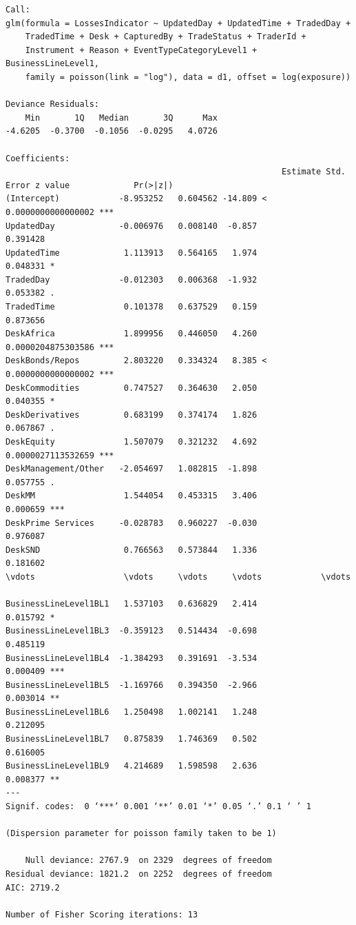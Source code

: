 \documentclass[]{DissertateUSU}
\begin{document}
\begin{verbatim}
Call:
glm(formula = LossesIndicator ~ UpdatedDay + UpdatedTime + TradedDay + 
    TradedTime + Desk + CapturedBy + TradeStatus + TraderId + 
    Instrument + Reason + EventTypeCategoryLevel1 + BusinessLineLevel1, 
    family = poisson(link = "log"), data = d1, offset = log(exposure))

Deviance Residuals: 
    Min       1Q   Median       3Q      Max  
-4.6205  -0.3700  -0.1056  -0.0295   4.0726  

Coefficients:
                                                        Estimate Std. Error z value             Pr(>|z|)    
(Intercept)            -8.953252   0.604562 -14.809 < 0.0000000000000002 ***
UpdatedDay             -0.006976   0.008140  -0.857             0.391428    
UpdatedTime             1.113913   0.564165   1.974             0.048331 *  
TradedDay              -0.012303   0.006368  -1.932             0.053382 .  
TradedTime              0.101378   0.637529   0.159             0.873656    
DeskAfrica              1.899956   0.446050   4.260   0.0000204875303586 ***
DeskBonds/Repos         2.803220   0.334324   8.385 < 0.0000000000000002 ***
DeskCommodities         0.747527   0.364630   2.050             0.040355 *  
DeskDerivatives         0.683199   0.374174   1.826             0.067867 .  
DeskEquity              1.507079   0.321232   4.692   0.0000027113532659 ***
DeskManagement/Other   -2.054697   1.082815  -1.898             0.057755 .  
DeskMM                  1.544054   0.453315   3.406             0.000659 ***
DeskPrime Services     -0.028783   0.960227  -0.030             0.976087    
DeskSND                 0.766563   0.573844   1.336             0.181602  
\vdots                  \vdots     \vdots     \vdots            \vdots  

BusinessLineLevel1BL1   1.537103   0.636829   2.414             0.015792 *  
BusinessLineLevel1BL3  -0.359123   0.514434  -0.698             0.485119    
BusinessLineLevel1BL4  -1.384293   0.391691  -3.534             0.000409 ***
BusinessLineLevel1BL5  -1.169766   0.394350  -2.966             0.003014 ** 
BusinessLineLevel1BL6   1.250498   1.002141   1.248             0.212095    
BusinessLineLevel1BL7   0.875839   1.746369   0.502             0.616005    
BusinessLineLevel1BL9   4.214689   1.598598   2.636             0.008377 ** 
---
Signif. codes:  0 ‘***’ 0.001 ‘**’ 0.01 ‘*’ 0.05 ‘.’ 0.1 ‘ ’ 1

(Dispersion parameter for poisson family taken to be 1)

    Null deviance: 2767.9  on 2329  degrees of freedom
Residual deviance: 1821.2  on 2252  degrees of freedom
AIC: 2719.2

Number of Fisher Scoring iterations: 13
\end{verbatim}
\end{document}
